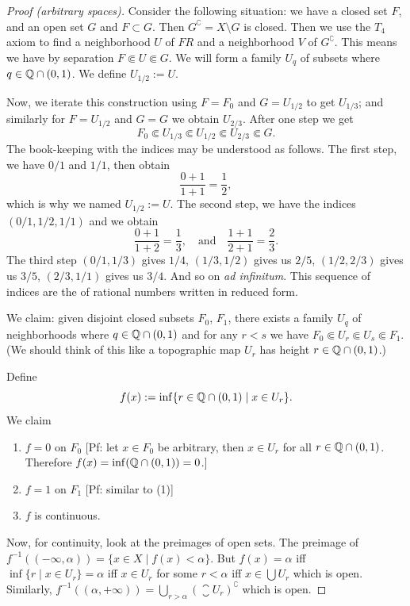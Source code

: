 \begin{proof}[Proof (arbitrary spaces)]
Consider the following situation: we have a closed set $F$, and an
open set $G$ and $F\subset G$. Then $G^{\complement}=X\setminus G$
is closed. Then we use the $T_{4}$ axiom to find a neighborhood $U$ of
$FR$ and a neighborhood $V$ of $G^{\complement}$. This means we have
by separation $F\Subset U\Subset G$. We will form a family $U_{q}$ of
subsets where $q\in\mathbb{Q}\cap(0,1)$. We define $U_{1/2}:=U$.

Now, we iterate this construction using $F=F_{0}$ and $G=U_{1/2}$ to
get $U_{1/3}$; and similarly for $F=U_{1/2}$ and $G=G$ we obtain
$U_{2/3}$. After one step we get
\begin{equation}
F_{0}\Subset U_{1/3}\Subset U_{1/2}\Subset U_{2/3}\Subset G.
\end{equation}
The book-keeping with the indices may be understood as follows. The
first step, we have $0/1$ and $1/1$, then obtain
\begin{equation}
\frac{0+1}{1+1}=\frac{1}{2},
\end{equation}
which is why we named $U_{1/2}:=U$. The second step, we have the
indices $(0/1, 1/2, 1/1)$ and we obtain
\begin{equation}
\frac{0+1}{1+2}=\frac{1}{3},\quad\mbox{and}\quad\frac{1+1}{2+1}=\frac{2}{3}.
\end{equation}
The third step $(0/1, 1/3)$ gives $1/4$, $(1/3,1/2)$ gives us $2/5$,
$(1/2,2/3)$ gives us $3/5$, $(2/3,1/1)$ gives us $3/4$. And so on
\textit{ad infinitum}. This sequence of indices are the 
of rational numbers written in reduced form.

We claim: given disjoint closed subsets $F_{0}$, $F_{1}$, there exists
a family $U_{q}$ of neighborhoods where $q\in\mathbb{Q}\cap(0,1)$ and for any
$r<s$ we have $F_{0}\Subset U_{r}\Subset U_{s}\Subset F_{1}$. (We
should think of this like a topographic map $U_{r}$ has height $r\in\mathbb{Q}\cap(0,1)$.)

Define
\begin{equation}
f(x):=\inf\{r\in\mathbb{Q}\cap(0,1)\mid x\in U_{r}\}.
\end{equation}
We claim
\begin{enumerate}
\item $f=0$ on $F_{0}$ [Pf: let $x\in F_{0}$ be arbitrary, then $x\in U_{r}$
  for all $r\in\mathbb{Q}\cap(0,1)$. Therefore $f(x)=\inf(\mathbb{Q}\cap(0,1))=0$.]
\item $f=1$ on $F_{1}$ [Pf: similar to (1)]
\item $f$ is continuous.
\end{enumerate}
Now, for continuity, look at the preimages of open sets. The preimage
of $f^{-1}((-\infty,\alpha))=\{x\in X\mid f(x)<\alpha\}$. But
$f(x)=\alpha$ iff $\inf\{r\mid x\in U_{r}\}=\alpha$ iff $x\in U_{r}$
for some $r<\alpha$ iff $x\in\bigcup U_{r}$ which is open. Similarly,
$f^{-1}((\alpha,+\infty))=\bigcup_{r>\alpha}(\closure{U_{r}})^{\complement}$
which is open.


\end{proof}
